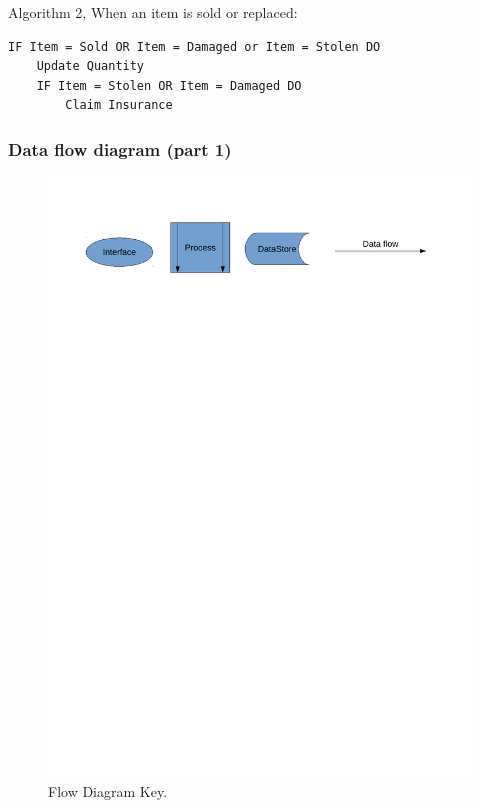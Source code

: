\documentclass[a4paper,12pt]{report}
\begin{document}
Algorithm 2, When an item is sold or replaced:
\begin{lstlisting}
IF Item = Sold OR Item = Damaged or Item = Stolen DO
    Update Quantity
    IF Item = Stolen OR Item = Damaged DO
        Claim Insurance
\end{lstlisting}



\subsubsection{Data flow diagram (part 1)}

\begin{figure}[H]
    \caption{Flow Diagram Key.} \label{fig:print_function_result}
    \includegraphics[width=\textwidth]{./Dataflow/DFD_analysis_key.pdf}
\end{figure}
\end{document}
